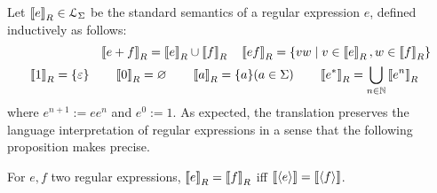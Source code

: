 \documentclass{lmcs}
\theoremstyle{plain}\newtheorem{satz}[thm]{Satz} %
\begin{document}
\noindent Let $\semreg{e} \in \Lang$ be the standard semantics of a regular expression $e$, defined inductively as follows:
\begin{align*}
\semreg{e+f} = \semreg{e} \cup \semreg{f} \quad
\semreg{ef} = \{vw \mid v\in \semreg{e}, w\in \semreg{f}\} \\
\semreg{1} = \{\varepsilon\} \qquad \semreg{0} = \varnothing
\qquad \semreg{a} =  \{a\} (a\in\alphabet)  \qquad
\semreg{e^*} = \bigcup_{n\in\N}\semreg{e^n} \quad
\end{align*}
where $e^{n+1} := ee^{n}$ and $e^0 := 1$.
As expected, the translation preserves the language interpretation of regular expressions in a sense that the following proposition makes precise.
\begin{prop}\label{thm:diagram-regexp}
For $e, f$ two regular expressions, $\semreg{e} = \semreg{f}$ iff $\sem{\transreg{e}} = \sem{\transreg{f}}$.
\end{prop}
\end{document}
